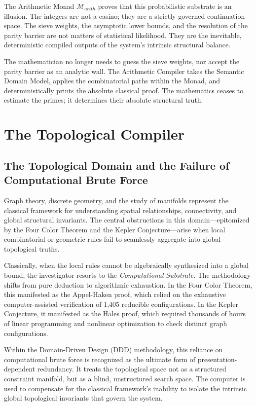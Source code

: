 \documentclass[12pt,openany]{extbook}
\theoremstyle{plain}
\theoremstyle{definition}
\begin{document}
The Arithmetic Monad $\mathcal{M}_{arith}$ proves that this probabilistic substrate is an illusion. The integers are not a casino; they are a strictly governed continuation space. The sieve weights, the asymptotic lower bounds, and the resolution of the parity barrier are not matters of statistical likelihood. They are the inevitable, deterministic compiled outputs of the system's intrinsic structural balance.

The mathematician no longer needs to guess the sieve weights, nor accept the parity barrier as an analytic wall. The Arithmetic Compiler takes the Semantic Domain Model, applies the combinatorial paths within the Monad, and deterministically prints the absolute classical proof. The mathematics ceases to estimate the primes; it determines their absolute structural truth.

\chapter{The Topological Compiler}

\section{The Topological Domain and the Failure of Computational Brute Force}

Graph theory, discrete geometry, and the study of manifolds represent the classical framework for understanding spatial relationships, connectivity, and global structural invariants. The central obstructions in this domain—epitomized by the Four Color Theorem and the Kepler Conjecture—arise when local combinatorial or geometric rules fail to seamlessly aggregate into global topological truths. 

Classically, when the local rules cannot be algebraically synthesized into a global bound, the investigator resorts to the \emph{Computational Substrate}. The methodology shifts from pure deduction to algorithmic exhaustion. In the Four Color Theorem, this manifested as the Appel-Haken proof, which relied on the exhaustive computer-assisted verification of 1,405 reducible configurations. In the Kepler Conjecture, it manifested as the Hales proof, which required thousands of hours of linear programming and nonlinear optimization to check distinct graph configurations.

Within the Domain-Driven Design (DDD) methodology, this reliance on computational brute force is recognized as the ultimate form of presentation-dependent redundancy. It treats the topological space not as a structured constraint manifold, but as a blind, unstructured search space. The computer is used to compensate for the classical framework's inability to isolate the intrinsic global topological invariants that govern the system.
\end{document}
